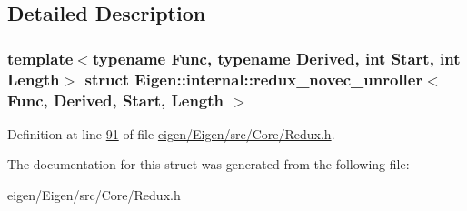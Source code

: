 \subsection{Detailed Description}
\subsubsection*{template$<$typename Func, typename Derived, int Start, int Length$>$\newline
struct Eigen\+::internal\+::redux\+\_\+novec\+\_\+unroller$<$ Func, Derived, Start, Length $>$}



Definition at line \hyperlink{eigen_2_eigen_2src_2_core_2_redux_8h_source_l00091}{91} of file \hyperlink{eigen_2_eigen_2src_2_core_2_redux_8h_source}{eigen/\+Eigen/src/\+Core/\+Redux.\+h}.



The documentation for this struct was generated from the following file\+:\begin{DoxyCompactItemize}
\item 
eigen/\+Eigen/src/\+Core/\+Redux.\+h\end{DoxyCompactItemize}
